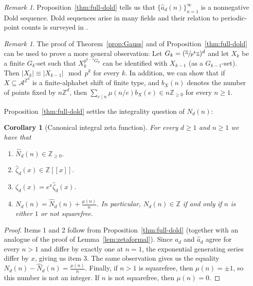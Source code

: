 \documentclass{article}
\theoremstyle{plain}
\newtheorem{corollary}[theorem]{Corollary}
\theoremstyle{definition}
\theoremstyle{remark}
\newtheorem{remark}[theorem]{Remark}
\newcommand{\Z}{\mathbb{Z}}
\newcommand{\quot}[2]{\sfrac{#1}{#2}}
\begin{document}
\begin{remark}
    Proposition~\ref{thm:full-dold} tells us that $\{\widehat a_d(n)\}_{n=1}^\infty$ is a nonnegative Dold sequence. Dold sequences arise in many fields and their relation to periodic-point counts is surveyed in \cite{byszewski2021dold}.
\end{remark}

\begin{remark}\label{rem:gener_action}
    The proof of Theorem~\ref{prop:Gauss} and of Proposition~\ref{thm:full-dold} can be used to prove a more general observation: Let $G_k=(\quot{\Z}{p^k\Z})^d$ and let $X_k$ be a finite $G_k$-set such that $X_k^{p^{k-1}G_k}$ can be identified with $X_{k-1}$ (as a $G_{k-1}$-set). Then $|X_k| \equiv |X_{k-1}| \mod p^k$ for every $k$. In addition, we can show that if $X\subseteq\mathcal A^{\Z^d}$ is a finite-alphabet shift of finite type, and $b_X(n)$ denotes the number of points fixed by $n\Z^d$, then $\sum_{e\mid n}\mu(n/e)b_X(e)\in n\Z_{\ge0}$ for every $n\ge1$. 
\end{remark}


Proposition~\ref{thm:full-dold} settles  the integrality question of $N_d(n)$:

\begin{corollary}[Canonical integral zeta function]\label{cor:integral-zeta}
For every $d \geq 1$ and $n \geq 1$ we have that 
\begin{enumerate}
    \item $\widehat N_d(n)\in\Z_{\ge0}$. 
    \item $\widehat\zeta_d(x)
\in\Z[[x]]$. 
    \item $\zeta_d(x)=e^x\widehat\zeta_d(x)$.
    \item $N_d(n)=\widehat N_d(n)+\frac{\mu(n)}n$. In particular, $N_d(n)\in\Z$ if and only if $n$ is either $1$ or not squarefree.
\end{enumerate}
\end{corollary}

\begin{proof}
Items 1 and 2 follow from Proposition~\ref{thm:full-dold} (together with an analogue of the proof of Lemma~\ref{lem:zetaformal}). Since $a_d$ and $\widehat{a}_d$ agree for every $n>1$ and differ  by exactly one at $n=1$, the exponential generating series differ by $x$, giving us item 3. The same observation gives us the equality $ N_d(n)-\widehat N_d(n)=\frac{\mu(n)}n$. Finally, if $n>1$ is squarefree, then $\mu(n)=\pm1$, so this number is not an integer. If $n$ is not squarefree, then $\mu(n)=0$.
\end{proof}
\end{document}

